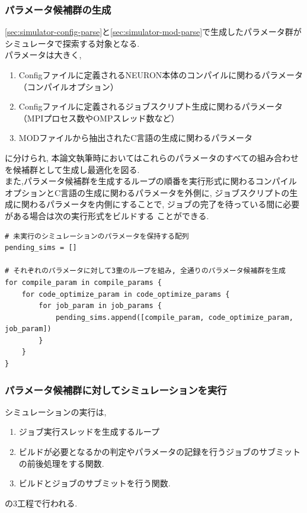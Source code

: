 \subsubsection{パラメータ候補群の生成}
\ref{sec:simulator-config-parse}と\ref{sec:simulator-mod-parse}で生成したパラメータ群がシミュレータで探索する対象となる.\\
パラメータは大きく,
\begin{enumerate}
\item Configファイルに定義されるNEURON本体のコンパイルに関わるパラメータ（コンパイルオプション）
\item Configファイルに定義されるジョブスクリプト生成に関わるパラメータ（MPIプロセス数やOMPスレッド数など）
\item MODファイルから抽出されたC言語の生成に関わるパラメータ
\end{enumerate}
に分けられ, 本論文執筆時においてはこれらのパラメータのすべての組み合わせを候補群として生成し最適化を図る.\\
また,パラメータ候補群を生成するループの順番を実行形式に関わるコンパイルオプションとC言語の生成に関わるパラメータを外側に,
ジョブスクリプトの生成に関わるパラメータを内側にすることで, ジョブの完了を待っている間に必要がある場合は次の実行形式をビルドする
ことができる.\\
{\footnotesize
\begin{lstlisting}[numbers=none, caption=パラメータ候補の生成　疑似コード]
# 未実行のシミュレーションのパラメータを保持する配列
pending_sims = []

# それぞれのパラメータに対して3重のループを組み, 全通りのパラメータ候補群を生成
for compile_param in compile_params {
    for code_optimize_param in code_optimize_params {
        for job_param in job_params {
            pending_sims.append([compile_param, code_optimize_param, job_param])
        }
    }
}
\end{lstlisting}
}

\subsubsection{パラメータ候補群に対してシミュレーションを実行}
シミュレーションの実行は,
\begin{enumerate}
\item ジョブ実行スレッドを生成するループ
\item ビルドが必要となるかの判定やパラメータの記録を行うジョブのサブミットの前後処理をする関数.
\item ビルドとジョブのサブミットを行う関数.
\end{enumerate}
の3工程で行われる.\\

